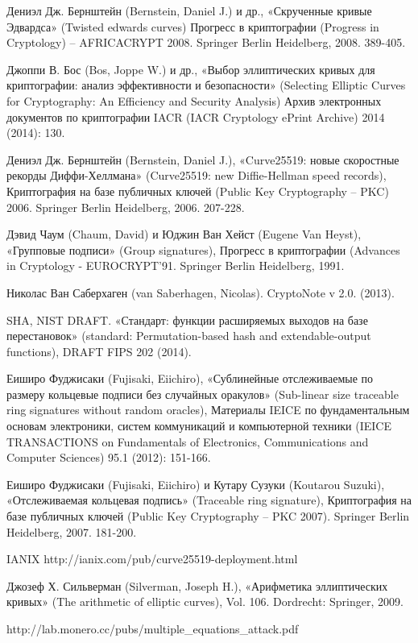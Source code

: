 \documentclass{mrl}
\numberwithin{equation}{section}
\numberwithin{figure}{section}
\begin{document}
\begin{thebibliography}{BBJLP}
 Дениэл Дж. Бернштейн (Bernstein, Daniel J.) и др., «Скрученные кривые Эдвардса» (Twisted edwards curves) Прогресс в криптографии (Progress in Cryptology) – \textendash{}AFRICACRYPT 2008. Springer Berlin Heidelberg, 2008. 389-405.

 Джоппи В. Бос (Bos, Joppe W.) и др., «Выбор эллиптических кривых для криптографии: анализ эффективности и безопасности» (Selecting Elliptic Curves for Cryptography: An Efficiency and Security Analysis) Архив электронных документов по криптографии IACR (IACR Cryptology ePrint Archive) 2014 (2014): 130.

 Дениэл Дж. Бернштейн (Bernstein, Daniel J.), «Curve25519: новые скоростные рекорды Диффи-Хеллмана» (Curve25519: new Diffie-Hellman speed records), Криптография на базе публичных ключей (Public Key Cryptography – PKC) 2006. Springer Berlin Heidelberg, 2006. 207-228.

 Дэвид Чаум (Chaum, David) и Юджин Ван Хейст (Eugene Van Heyst), «Групповые подписи» (Group signatures), Прогресс в криптографии (Advances in Cryptology - \textemdash{}EUROCRYPT\textquoteright{}91. Springer Berlin Heidelberg, 1991.

 Николас Ван Саберхаген (van Saberhagen, Nicolas). CryptoNote v 2.0. (2013).

 SHA, NIST DRAFT. «Стандарт: функции расширяемых выходов на базе перестановок» (standard: Permutation-based hash and extendable-output functions), DRAFT FIPS 202 (2014).

 Еиширо Фуджисаки (Fujisaki, Eiichiro), «Сублинейные отслеживаемые по размеру кольцевые подписи без случайных оракулов» (Sub-linear size traceable ring signatures without random oracles), Материалы IEICE по фундаментальным основам электроники, систем коммуникаций и компьютерной техники (IEICE TRANSACTIONS on Fundamentals of Electronics, Communications and Computer Sciences) 95.1 (2012): 151-166.

 Еиширо Фуджисаки (Fujisaki, Eiichiro) и Кутару Сузуки (Koutarou Suzuki), «Отслеживаемая кольцевая подпись» (Traceable ring signature), Криптография на базе публичных ключей (Public Key Cryptography – \textendash{}PKC 2007). Springer Berlin Heidelberg, 2007. 181-200.

 IANIX http://ianix.com/pub/curve25519-deployment.html

 Джозеф Х. Сильверман (Silverman, Joseph H.), «Арифметика эллиптических кривых» (The arithmetic of elliptic curves), Vol. 106. Dordrecht: Springer, 2009.

 http://lab.monero.cc/pubs/multiple\_equations\_attack.pdf\end{thebibliography}
\end{document}
